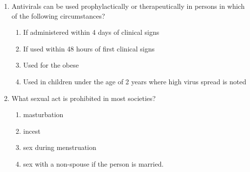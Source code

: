 \documentclass[12pt]{article}
\begin{document}
\begin{enumerate}[label=\arabic*.]
\begin{enumerate}[label=(\alph*)]
\end{enumerate}
\item Antivirals can be used prophylactically or therapeutically in persons in which of the following circumstances?
\begin{enumerate}[label=(\alph*)]
    \item If administered within 4 days of clinical signs
    \item If used within 48 hours of first clinical signs
    \item Used for the obese
    \item Used in children under the age of 2 years where high virus spread is noted
\end{enumerate}
\item What sexual act is prohibited in most societies?
\begin{enumerate}[label=(\alph*)]
    \item masturbation
    \item incest
    \item sex during menstruation
    \item sex with a non-spouse if the person is married.
\end{enumerate}
\end{enumerate}
\end{document}
